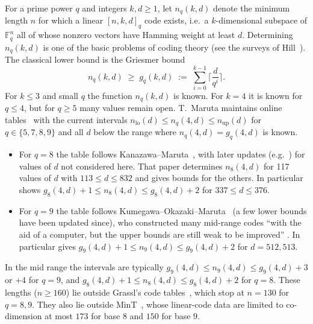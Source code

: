 \documentclass[11pt]{article}
\numberwithin{equation}{section}
\theoremstyle{definition}
\theoremstyle{remark}
\newcommand{\F}{\mathbb F}
\begin{document}
For a prime power $q$ and integers $k,d\ge 1$, let $n_q(k,d)$ denote the minimum length $n$ for
which a linear $[n,k,d]_q$ code exists, i.e.\ a $k$-dimensional subspace of $\F_q^n$ all of whose
nonzero vectors have Hamming weight at least $d$. Determining $n_q(k,d)$ is one of the basic
problems of coding theory (see the surveys of Hill~\cite{Hill1992}). The classical lower bound is
the Griesmer bound~\cite{Griesmer1960,SolomonStiffler1965}
\[
  n_q(k,d)\;\ge\; g_q(k,d)\;:=\;\sum_{i=0}^{k-1}\Big\lceil \frac{d}{q^{i}}\Big\rceil .
\]
For $k\le 3$ and small $q$ the function $n_q(k,d)$ is known. For $k=4$ it is known for
$q\le 4$, but for $q\ge 5$ many values remain open.
T.~Maruta maintains online tables~\cite{MarutaTable} with the current
intervals $n_{\mathrm{lo}}(d)\le n_q(4,d)\le n_{\mathrm{up}}(d)$ for $q\in\{5,7,8,9\}$ and all $d$
below the range where $n_q(4,d)=g_q(4,d)$ is known.
\begin{itemize}
\item For $q=8$ the table follows Kanazawa--Maruta~\cite{KanazawaMaruta2011}, with later updates
(e.g.~\cite{BFM2021,MaLuo2024}) for values of $d$ not considered here. That paper determines
$n_8(4,d)$ for 117 values of $d$ with $113\le d\le 832$ and gives bounds for the others. In
particular \cite[Thm.~1.1(4)]{KanazawaMaruta2011} shows
$g_8(4,d)+1\le n_8(4,d)\le g_8(4,d)+2$ for $337\le d\le 376$.
\item For $q=9$ the table follows Kumegawa--Okazaki--Maruta~\cite{KOM2017} (a few lower bounds have been
updated since), who constructed many
mid-range codes ``with the aid of a computer, but the upper bounds are still weak to be improved''
\cite[p.~10]{KOM2017}. In particular \cite[Thm.~1.7(4)]{KOM2017} gives
$g_9(4,d)+1\le n_9(4,d)\le g_9(4,d)+2$ for $d=512,513$.
\end{itemize}
In the mid range the intervals are typically $g_9(4,d)\le n_9(4,d)\le g_9(4,d)+3$ or $+4$ for $q=9$, and
$g_8(4,d)+1\le n_8(4,d)\le g_8(4,d)+2$ for $q=8$. These lengths ($n\ge 160$) lie outside Grassl's
code tables~\cite{Grassl}, which stop at $n=130$ for $q=8,9$. They also lie outside MinT~\cite{MinT},
whose linear-code data are limited to co-dimension at most $173$ for base $8$ and $150$ for base $9$.
\end{document}
